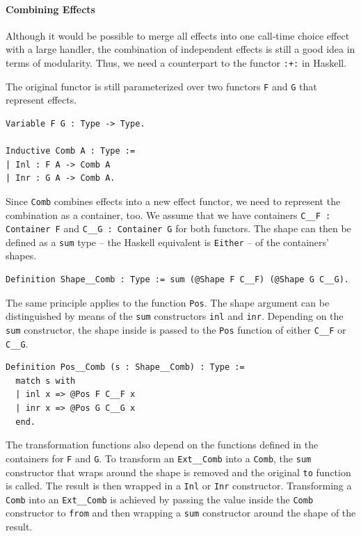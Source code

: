 \documentclass[a4paper, 11pt, fleqn, twoside]{scrreprt}
\newcommand{\hinl}[1]{\texttt{#1}}
\newcommand{\cinl}[1]{\texttt{#1}}
\begin{document}
\paragraph{Combining Effects}
Although it would be possible to merge all effects into one call-time choice effect with a large handler, the combination of independent effects is still a good idea in terms of modularity.
Thus, we need a counterpart to the functor \hinl{:+:} in Haskell.

The original functor is still parameterized over two functors \cinl{F} and \cinl{G} that represent effects.

\begin{verbatim}
Variable F G : Type -> Type.

Inductive Comb A : Type :=
| Inl : F A -> Comb A
| Inr : G A -> Comb A.
\end{verbatim}

Since \cinl{Comb} combines effects into a new effect functor, we need to represent the combination as a container, too.
We assume that we have containers \cinl{C__F : Container F} and \cinl{C__G : Container G} for both functors.
The shape can then be defined as a \cinl{sum} type -- the Haskell equivalent is \hinl{Either} -- of the containers' shapes.

\begin{verbatim}
Definition Shape__Comb : Type := sum (@Shape F C__F) (@Shape G C__G).
\end{verbatim}

The same principle applies to the function \cinl{Pos}.
The shape argument can be distinguished by means of the \cinl{sum} constructors \cinl{inl} and \cinl{inr}.
Depending on the \cinl{sum} constructor, the shape inside is passed to the \cinl{Pos} function of either \cinl{C__F} or \cinl{C__G}.

\begin{verbatim}
Definition Pos__Comb (s : Shape__Comb) : Type :=
  match s with
  | inl x => @Pos F C__F x
  | inr x => @Pos G C__G x
  end.
\end{verbatim}

The transformation functions also depend on the functions defined in the containers for \cinl{F} and \cinl{G}.
To transform an \cinl{Ext__Comb} into a \cinl{Comb}, the \cinl{sum} constructor that wraps around the shape is removed and the original \cinl{to} function is called.
The result is then wrapped in a \cinl{Inl} or \cinl{Inr} constructor.
Transforming a \cinl{Comb} into an \cinl{Ext__Comb} is achieved by passing the value inside the \hinl{Comb} constructor to \cinl{from} and then wrapping a \cinl{sum} constructor around the shape of the result.
\end{document}
